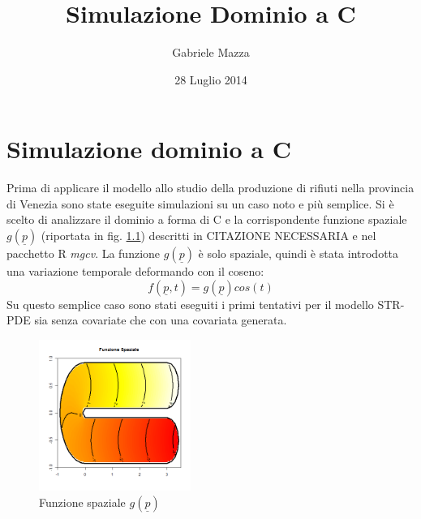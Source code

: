 \documentclass[a4paper,11pt,twoside,openright]{book}							%
\date{28 Luglio 2014}
\author{Gabriele Mazza}
\title{Simulazione Dominio a C}
\begin{document}

\chapter{Simulazione dominio a C}

Prima di applicare il modello allo studio della produzione di rifiuti nella provincia di Venezia sono state eseguite simulazioni su un caso noto e più semplice. Si è scelto di analizzare il dominio a forma di C e la corrispondente funzione spaziale $g(\underline p)$ (riportata in fig. \ref{fig:domC_fstest}) descritti in CITAZIONE NECESSARIA e nel pacchetto R \textit{mgcv}. La funzione $g(\underline p)$ è solo spaziale, quindi è stata introdotta una variazione temporale deformando con il coseno:
$$
f(\underline p, t)=g(\underline p)cos(t)
$$
Su questo semplice caso sono stati eseguiti i primi tentativi per il modello STR-PDE sia senza covariate che con una covariata generata.
\begin{figure}[h]
	\centering
	\includegraphics[width=0.44\textwidth]{Immagini/DomCinizio/DomC_fstest.png}   
	\caption{Funzione spaziale $g(\underline p)$}
	\label{fig:domC_fstest}
\end{figure}
\end{document}
